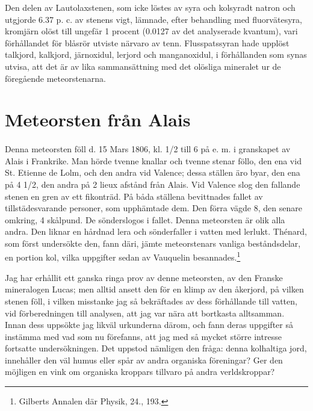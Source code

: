 \documentclass[a4paper, 12pt, oneside, swedish]{article}
\begin{document}
Den delen av Lautolaxstenen, som icke löstes av syra och kolsyradt natron och utgjorde 6.37 p. c. av stenens vigt, lämnade, efter behandling med fluorvätesyra, kromjärn olöst till ungefär 1 procent (0.0127 av det analyserade kvantum), vari förhållandet för blåsrör utviste närvaro av tenn. Flusspatssyran hade upplöst talkjord, kalkjord, järnoxidul, lerjord och manganoxidul, i förhållanden som synas utvisa, att det är av lika sammansättning med det olösliga mineralet ur de föregående meteorstenarna.
\clearpage
\section{Meteorsten från Alais}
\paragraph{}
Denna meteorsten föll d. 15 Mars 1806, kl. 1/2 till 6 på e. m. i granskapet av Alais i Frankrike. Man hörde tvenne knallar och tvenne stenar föllo, den ena vid St. Etienne de Lolm, och den andra vid Valence; dessa ställen äro byar, den ena på 4 1/2, den andra på 2 lieux afstånd från Alais. Vid Valence slog den fallande stenen en gren av ett fikonträd. På båda ställena bevittnades fallet av tillstädesvarande personer, som upphämtade dem. Den förra vägde 8, den senare omkring, 4 skålpund. De sönderslogos i fallet. Denna meteorsten är olik alla andra. Den liknar en hårdnad lera och sönderfaller i vatten med lerlukt. Thénard, som först undersökte den, fann däri, jämte meteorstenars vanliga beståndsdelar, en portion kol, vilka uppgifter sedan av Vauquelin besannades.\footnote{Gilberts Annalen där Physik, 24., 193.}

Jag har erhållit ett ganska ringa prov av denne meteorsten, av den Franske mineralogen Lucas; men alltid ansett den för en klimp av den åkerjord, på vilken stenen föll, i vilken misstanke jag så bekräftades av dess förhållande till vatten, vid förberedningen till analysen, att jag var nära att bortkasta alltsamman. Innan dess uppsökte jag likväl urkunderna därom, och fann deras uppgifter så instämma med vad som nu förefanns, att jag med så mycket större intresse fortsatte undersökningen. Det uppstod nämligen den fråga: denna kolhaltiga jord, innehåller den väl humus eller spår av andra organiska föreningar? Ger den möjligen en vink om organiska kroppars tillvaro på andra verldskroppar?
\end{document}
